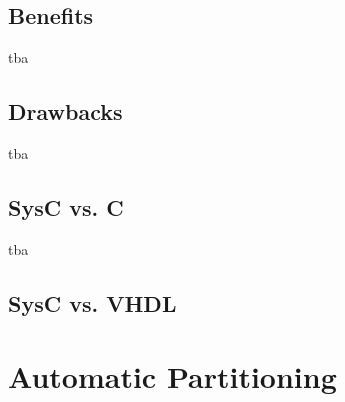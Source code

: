 \documentclass{article}
\begin{document}
	  \subsection{Benefits}
	  tba
	  \subsection{Drawbacks}
	  tba
	  \subsection{SysC vs. C}
	  tba
	  \subsection{SysC vs. VHDL}

	\section{Automatic Partitioning}
\end{document}
